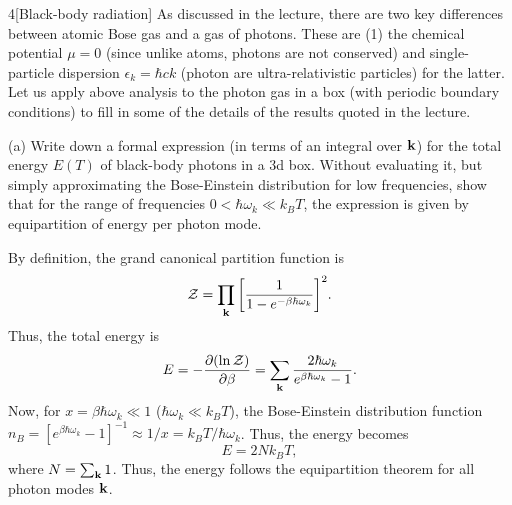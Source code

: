 \documentclass[12pt]{article}
\begin{document}
\begin{problem}{4}[Black-body radiation]
As discussed in the lecture, there are two key differences between atomic Bose
gas and a gas of photons. These are (1) the chemical potential $\mu=0$ (since
unlike atoms, photons are not conserved) and single-particle dispersion
$\epsilon_k=\hbar ck$ (photon are ultra-relativistic particles) for the latter.
Let us apply above analysis to the photon gas in a box (with periodic boundary
conditions) to fill in some of the details of the results quoted in the lecture.

(a) Write down a formal expression (in terms of an integral over $\vb{k}$) for
the total energy $E(T)$ of black-body photons in a 3d box. Without evaluating
it, but simply approximating the Bose-Einstein distribution for low frequencies,
show that for the range of frequencies $0<\hbar\omega_k\ll k_BT$, the expression
is given by equipartition of energy per photon mode.
\begin{solution}
    By definition, the grand canonical partition function is
    \begin{equation}
        \mathcal{Z}=\prod_{\vb{k}}\qty[\frac1{1-e^{-\beta\hbar\omega_k}}]^2. 
    \end{equation}
    Thus, the total energy is
    \begin{equation}
        E=-\frac{\partial(\ln\mathcal{Z})}{\partial\beta} 
        =\sum_{\vb{k}}\frac{2\hbar\omega_k}{e^{\beta\hbar\omega_k}-1}.
    \end{equation}
Now, for $x=\beta\hbar\omega_k\ll 1$ ($\hbar\omega_k\ll k_BT$), the
Bose-Einstein distribution function
$n_B=[e^{\beta\hbar\omega_k}-1]^{-1}\approx1/x=k_BT/\hbar\omega_k$. Thus, the
energy becomes
\begin{equation}
    E=2Nk_BT, 
\end{equation}
where $N=\sum_{\vb{k}}1$. Thus, the energy follows the equipartition theorem for
all photon modes $\vb{k}$.
\end{solution}


\end{problem}
\end{document}
